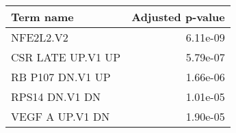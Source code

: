 \begin{tabular}{lr}
\toprule
         Term name &  Adjusted p-value \\
\midrule
         NFE2L2.V2 &          6.11e-09 \\
 CSR LATE UP.V1 UP &          5.79e-07 \\
  RB P107 DN.V1 UP &          1.66e-06 \\
    RPS14 DN.V1 DN &          1.01e-05 \\
   VEGF A UP.V1 DN &          1.90e-05 \\
\bottomrule
\end{tabular}
